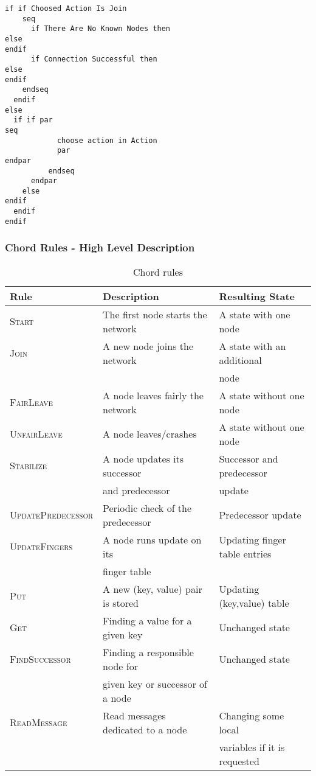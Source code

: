 \documentclass{amsart}
\theoremstyle{definition}
\begin{document}
\begin{lstlisting}[escapechar=\%]
if if Choosed Action Is Join
    seq
      if There Are No Known Nodes then
else
endif
      if Connection Successful then
else
endif
    endseq
  endif
else
  if if par
seq
            choose action in Action
            par
endpar
          endseq
      endpar
    else
endif
  endif
endif
\end{lstlisting}

\subsubsection{Chord Rules - High Level Description}


\begin{table}
\centering
 \begin{tabular}[]{|l|l|l|}
  \hline
  \textbf{Rule} & \textbf{Description} & \textbf{Resulting State} \\
\hline
\textsc{Start} & The first node starts the network & A state with one node \\
\hline
\textsc{Join} & A new node joins the network & A state with an additional \\
   & & node \\
\hline
\textsc{FairLeave} & A node leaves fairly the network & A state without one node \\
\hline
  \textsc{UnfairLeave} & A node leaves/crashes & A state without one node \\
\hline
\textsc{Stabilize} & A node updates its successor & Successor and predecessor\\
   & and predecessor & update\\
\hline
\textsc{UpdatePredecessor} & Periodic check of the predecessor & Predecessor update \\
\hline
\textsc{UpdateFingers} & A node runs update on its  & Updating finger table entries  \\
  & finger table& \\
\hline
\textsc{Put} & A new (key, value) pair is stored & Updating (key,value) table \\
\hline
\textsc{Get} & Finding a value for a given key & Unchanged state \\ \hline
\textsc{FindSuccessor} & Finding a responsible node for & Unchanged state \\
  & given key or successor of a node& \\
\hline
\textsc{ReadMessage} & Read messages dedicated to a node & Changing some local  \\
  & & variables if it is requested \\ \hline
\end{tabular}

\caption{Chord rules} \label{chord_actions}
\vspace{-0.5cm}
\end{table}
\end{document}
